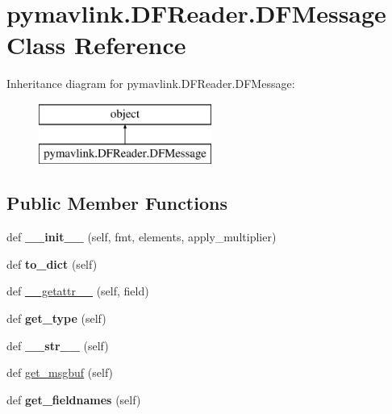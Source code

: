 \hypertarget{classpymavlink_1_1DFReader_1_1DFMessage}{}\section{pymavlink.\+D\+F\+Reader.\+D\+F\+Message Class Reference}
\label{classpymavlink_1_1DFReader_1_1DFMessage}
Inheritance diagram for pymavlink.\+D\+F\+Reader.\+D\+F\+Message\+:\begin{figure}[H]
\begin{center}
\leavevmode
\includegraphics[height=2.000000cm]{classpymavlink_1_1DFReader_1_1DFMessage}
\end{center}
\end{figure}
\subsection*{Public Member Functions}
\begin{DoxyCompactItemize}
\item 
\mbox{\label{classpymavlink_1_1DFReader_1_1DFMessage_a783e0f90a8f515f7f7e7205a4a3c36c5}} 
def {\bfseries \+\_\+\+\_\+init\+\_\+\+\_\+} (self, fmt, elements, apply\+\_\+multiplier)
\item 
\mbox{\label{classpymavlink_1_1DFReader_1_1DFMessage_abedd59fd89e788b1fb7b00cadf540754}} 
def {\bfseries to\+\_\+dict} (self)
\item 
def \hyperlink{classpymavlink_1_1DFReader_1_1DFMessage_aeda9e43b0ace0421511eacc1b8701464}{\+\_\+\+\_\+getattr\+\_\+\+\_\+} (self, field)
\item 
\mbox{\label{classpymavlink_1_1DFReader_1_1DFMessage_ad59991dfc317e0c1db4390ef99a31f1a}} 
def {\bfseries get\+\_\+type} (self)
\item 
\mbox{\label{classpymavlink_1_1DFReader_1_1DFMessage_a51f01505f918b49aaa444c8a83410fc7}} 
def {\bfseries \+\_\+\+\_\+str\+\_\+\+\_\+} (self)
\item 
def \hyperlink{classpymavlink_1_1DFReader_1_1DFMessage_ab3d2d7f301462cc0343798a3d6486d8a}{get\+\_\+msgbuf} (self)
\item 
\mbox{\label{classpymavlink_1_1DFReader_1_1DFMessage_a6419df98bd311797fb1a24ee517b8483}} 
def {\bfseries get\+\_\+fieldnames} (self)
\end{DoxyCompactItemize}
